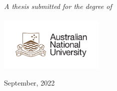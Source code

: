 \begin{titlepage}
\begin{center}

\large \textit{A thesis submitted for the degree of \degreename}\\[0.7cm] %
\deptname\\ %


\includegraphics[width=5cm]{gfx/ANU_LOGO_cmyk_56mm}

{\normalsize September, 2022}\\[2cm] %

\end{center}
\end{titlepage}


